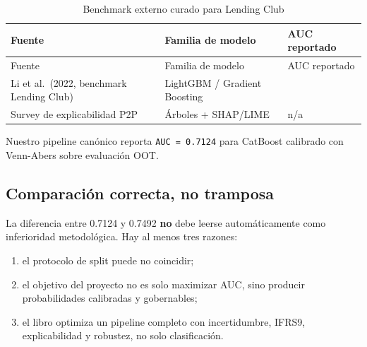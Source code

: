 \documentclass[
  spanish,
  11pt,
  letterpaper,
]{scrbook}
\providecommand{\tightlist}{%
  \setlength{\itemsep}{0pt}\setlength{\parskip}{0pt}}
\theoremstyle{plain}
\theoremstyle{remark}
\begin{document}
\begin{longtable}[]{@{}
  >{\raggedright\arraybackslash}p{}
  >{\raggedright\arraybackslash}p{}
  >{\raggedleft\arraybackslash}p{}@{}}
\caption{Benchmark externo curado para Lending
Club}\label{tbl-literature-benchmark}\tabularnewline
\toprule\noalign{}
\begin{minipage}[b]{\linewidth}\raggedright
Fuente
\end{minipage} & \begin{minipage}[b]{\linewidth}\raggedright
Familia de modelo
\end{minipage} & \begin{minipage}[b]{\linewidth}\raggedleft
AUC reportado
\end{minipage} \\
\midrule\noalign{}
\endfirsthead
\toprule\noalign{}
\begin{minipage}[b]{\linewidth}\raggedright
Fuente
\end{minipage} & \begin{minipage}[b]{\linewidth}\raggedright
Familia de modelo
\end{minipage} & \begin{minipage}[b]{\linewidth}\raggedleft
AUC reportado
\end{minipage} \\
\midrule\noalign{}
\endhead
\bottomrule\noalign{}
\endlastfoot
Li et al.~(2022, benchmark Lending Club) & LightGBM / Gradient Boosting
& 0.7492 \\
Survey de explicabilidad P2P & Árboles + SHAP/LIME & n/a \\
\end{longtable}

Nuestro pipeline canónico reporta \texttt{AUC\ =\ 0.7124} para CatBoost
calibrado con Venn-Abers sobre evaluación OOT.

\subsection{Comparación correcta, no
tramposa}\label{comparaciuxf3n-correcta-no-tramposa}

La diferencia entre 0.7124 y 0.7492 \textbf{no} debe leerse
automáticamente como inferioridad metodológica. Hay al menos tres
razones:

\begin{enumerate}
\def\labelenumi{\arabic{enumi}.}
\tightlist
\item
  el protocolo de split puede no coincidir;
\item
  el objetivo del proyecto no es solo maximizar AUC, sino producir
  probabilidades calibradas y gobernables;
\item
  el libro optimiza un pipeline completo con incertidumbre, IFRS9,
  explicabilidad y robustez, no solo clasificación.
\end{enumerate}
\end{document}
